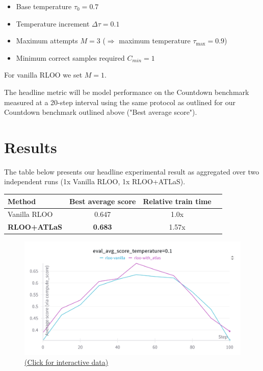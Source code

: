 \documentclass{article}
\begin{document}
\begin{itemize}
    \item Base temperature $\tau_0 = 0.7$
    \item Temperature increment $\Delta\tau = 0.1$
    \item Maximum attempts $M = 3$ ($\Rightarrow$ maximum temperature $\tau_{\max} = 0.9$)
    \item Minimum correct samples required $C_{min} = 1$
\end{itemize}

For vanilla RLOO we set $M=1$.

The headline metric will be model performance on the Countdown benchmark measured at a 20-step interval using the same protocol as outlined for our Countdown benchmark outlined above ("Best average score").

\section{Results}

The table below presents our headline experimental result as aggregated over two independent runs (1x Vanilla RLOO, 1x RLOO+ATLaS).

\begin{table}[h]
\centering
\label{tab:main_results}
\begin{tabular}{lccc}
\toprule
Method & Best average score & Relative train time \\
\midrule
Vanilla RLOO & 0.647 & 1.0x & \\
\textbf{RLOO+ATLaS} & \textbf{0.683} & 1.57x \\
\bottomrule
\end{tabular}
\end{table}

\begin{figure}[h]
  \centering
  \includegraphics[width=0.8\columnwidth]{images/rloocomp.png}
  \vspace{-10pt}
  \caption*{\href{https://wandb.ai/jonathanalgar/countdown-rl-prod/workspace/panel/etxgwewfv}{(Click for interactive data)}}
\end{figure}
\end{document}
